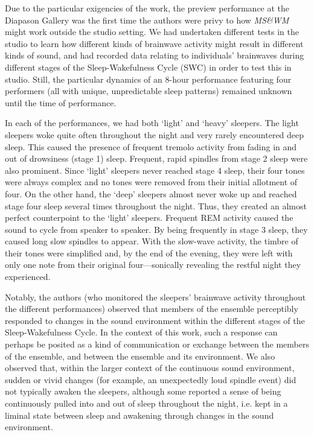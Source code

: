 Due to the particular exigencies of the work, the preview performance at the
Diapason Gallery was the first time the authors were privy to how \textit{MS\&WM
}might work outside the studio setting.  We had undertaken different tests in the
studio to learn how different kinds of brainwave activity might result in
different kinds of sound, and had recorded data relating to individuals'
brainwaves during different stages of the Sleep-Wakefulness Cycle (SWC) in order
to test this in studio. Still, the particular dynamics of an 8-hour performance
featuring four performers (all with unique, unpredictable sleep patterns)
remained unknown until the time of performance.

In each of the performances, we had both `light' and  `heavy' sleepers. The
light sleepers woke quite often throughout the night and very rarely encountered
deep sleep.  This caused the presence of frequent tremolo activity from fading in
and out of drowsiness (stage 1) sleep.  Frequent, rapid spindles from stage 2
sleep were also prominent.  Since `light' sleepers never reached stage 4 sleep,
their four tones were always complex and no tones were removed from their initial
allotment of four.  On the other hand, the `deep' sleepers almost never woke up
and reached stage four sleep several times throughout the night.  Thus, they
created an almost perfect counterpoint to the `light' sleepers.  Frequent REM
activity caused the sound to cycle from speaker to speaker.  By being frequently
in stage 3 sleep, they caused long slow spindles to appear.  With the slow-wave
activity, the timbre of their tones were simplified and, by the end of the
evening, they were left with only one note from their original four---sonically
revealing the restful night they experienced.

Notably, the authors (who monitored the sleepers' brainwave activity throughout
the different performances) observed that members of the ensemble perceptibly
responded to changes in the sound environment within the different stages of the
Sleep-Wakefulness Cycle. In the context of this work, such a response can perhaps
be posited as a kind of communication or exchange between the members of the
ensemble, and between the ensemble and its environment.  We also observed that,
within the larger context of the continuous sound environment, sudden or vivid
changes (for example, an unexpectedly loud spindle event) did not typically
awaken the sleepers, although some reported a sense of being continuously pulled
into and out of sleep throughout the night, i.e. kept in a liminal state between
sleep and awakening through changes in the sound environment.

